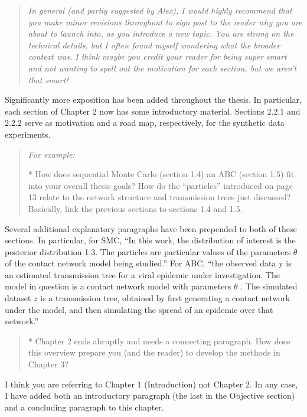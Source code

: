 \documentclass[12pt]{article}
\begin{document}
\begin{quote}
  \itshape
  In general (and partly suggested by Alex), I would highly recommend that you
  make minor revisions throughout to sign post to the reader why you are about
  to launch into, as you introduce a new topic.  You are strong on the
  technical details, but I often found myself wondering what the broader
  context was.  I think maybe you credit your reader for being super smart and
  not wanting to spell out the motivation for each section, but we aren’t that
  smart!
\end{quote}

Significantly more exposition has been added throughout the thesis. In
particular, each section of Chapter 2 now has some introductory material.
Sections 2.2.1 and 2.2.2 serve as motivation and a road map, respectively, for
the synthetic data experiments.

\begin{quote}
  \itshape
  For example:

  * How does sequential Monte Carlo (section 1.4) an ABC (section 1.5) fit into
  your overall thesis goals?  How do the ``particles'' introduced on page 13
  relate to the network structure and transmission trees just discussed?
  Basically, link the previous sections to sections 1.4 and 1.5.
\end{quote}

Several additional explanatory paragraphs have been prepended to both of these
sections. In particular, for SMC, ``In this work, the distribution of interest
is the posterior distribution 1.3. The particles are particular values of the
parameters $\theta$ of the contact network model being studied.'' For ABC,
``the observed data y is an estimated transmission tree for a viral epidemic
under investigation. The model in question is a contact network model with
parameters $\theta$ . The simulated dataset $z$ is a transmission tree,
obtained by first generating a contact network under the model, and then
simulating the spread of an epidemic over that network.''

\begin{quote}
  \itshape

  * Chapter 2 ends abruptly and needs a connecting paragraph.  How does this overview prepare you (and the reader) to develop the methods in Chapter 3?
\end{quote}

I think you are referring to Chapter 1 (Introduction) not Chapter 2. In any
case, I have added both an introductory paragraph (the last in the Objective
section) and a concluding paragraph to this chapter.
\end{document}
